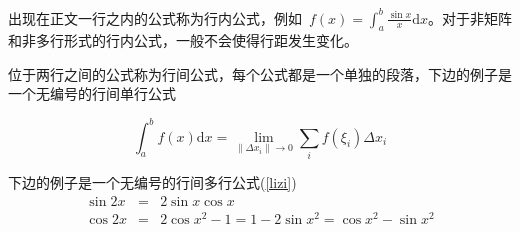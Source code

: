 

出现在正文一行之内的公式称为行内公式，例如~$f(x)=\int_{a}^{b}\frac{\sin{x}}{x}\mathrm{d}x$。对于非矩阵和非多行形式的行内公式，一般不会使得行距发生变化。


位于两行之间的公式称为行间公式，每个公式都是一个单独的段落，下边的例子是一个无编号的行间单行公式

\[
\int_a^b{f\left(x\right)\mathrm{d}x}=\lim_{\left\|\Delta{x_i}\right\|\to 0}\sum_i{f\left(\xi_i\right)\Delta{x_i}}
\]

下边的例子是一个无编号的行间多行公式(\ref{lizi})
\begin{eqnarray*}\label{lizi}
\sin 2x&=&2\sin x\cos x\\
\cos 2x&=&2\cos x^2-1=1-2\sin x^2=\cos x^2-\sin x^2
\end{eqnarray*}